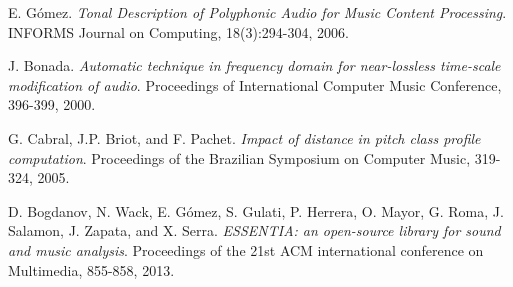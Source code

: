 \documentclass[11pt, oneside]{Thesis} %
\begin{document}
\begin{thebibliography}{99}
E. Gómez.
\textit{Tonal Description of Polyphonic Audio for Music Content Processing}.
INFORMS Journal on Computing, 18(3):294-304, 2006.

J. Bonada.
\textit{Automatic technique in frequency domain for near-lossless time-scale modification of audio}.
Proceedings of International Computer Music Conference, 396-399, 2000.

G. Cabral, J.P. Briot, and F. Pachet. 
\textit{Impact of distance in pitch class profile computation}.
Proceedings of the Brazilian Symposium on Computer Music, 319-324, 2005.

D. Bogdanov, N. Wack, E. Gómez, S. Gulati, P. Herrera, O. Mayor, G. Roma, J. Salamon, J. Zapata, and X. Serra.
\textit{ESSENTIA: an open-source library for sound and music analysis}.
Proceedings of the 21st ACM international conference on Multimedia, 855-858, 2013.

\end{thebibliography}


\end{document}
